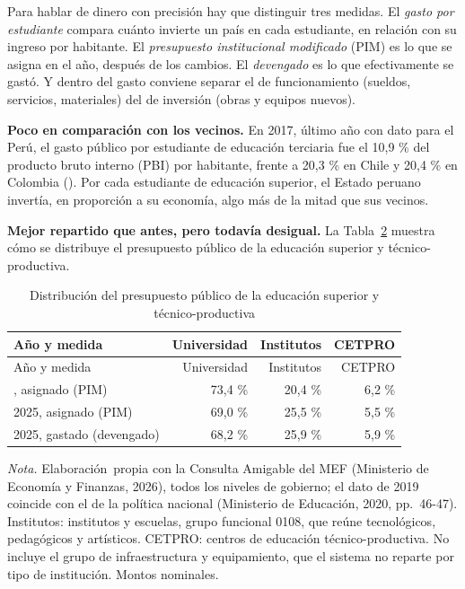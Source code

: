 \documentclass[
  jou,
  floatsintext,
  longtable,
  a4paper,
  nolmodern,
  notxfonts,
  notimes,
  12pt,
  colorlinks=true,linkcolor=blue,citecolor=blue,urlcolor=blue]{apa7}
\newenvironment{twocolumntable}%
{%
\begin{table}[!htbp]%
\onecolumn%
}%
{%
\twocolumn%
\end{table}%
}%
\begin{document}
Para hablar de dinero con precisión hay que distinguir tres medidas. El
\emph{gasto por estudiante} compara cuánto invierte un país en cada
estudiante, en relación con su ingreso por habitante. El
\emph{presupuesto institucional modificado} (PIM) es lo que se asigna en
el año, después de los cambios. El \emph{devengado} es lo que
efectivamente se gastó. Y dentro del gasto conviene separar el de
funcionamiento (sueldos, servicios, materiales) del de inversión (obras
y equipos nuevos).

\textbf{Poco en comparación con los vecinos.} En 2017, último año con
dato para el Perú, el gasto público por estudiante de educación
terciaria fue el 10,9 \% del producto bruto interno (PBI) por habitante,
frente a 20,3 \% en Chile y 20,4 \% en Colombia
(). Por cada estudiante de educación superior, el Estado peruano
invertía, en proporción a su economía, algo más de la mitad que sus
vecinos.

\textbf{Mejor repartido que antes, pero todavía desigual.} La
Tabla~\ref{tbl-gasto} muestra cómo se distribuye el presupuesto público
de la educación superior y técnico-productiva.

\begin{twocolumntable}

\begin{longtable}[]{@{}lrrr@{}}
\caption{Distribución del presupuesto público de la educación superior y
técnico-productiva}\label{tbl-gasto}\tabularnewline
\toprule\noalign{}
Año y medida & Universidad & Institutos & CETPRO \\
\midrule\noalign{}
\endfirsthead
\toprule\noalign{}
Año y medida & Universidad & Institutos & CETPRO \\
\midrule\noalign{}
\endhead
\bottomrule\noalign{}
\endlastfoot
2019, asignado (PIM) & 73,4 \% & 20,4 \% & 6,2 \% \\
2025, asignado (PIM) & 69,0 \% & 25,5 \% & 5,5 \% \\
2025, gastado (devengado) & 68,2 \% & 25,9 \% & 5,9 \% \\
\end{longtable}

\noindent \emph{Nota.} Elaboración~propia con la Consulta Amigable del
MEF (Ministerio de Economía y Finanzas, 2026), todos los niveles de
gobierno; el dato de 2019 coincide con el de la política nacional
(Ministerio de Educación, 2020, pp.~46-47). Institutos: institutos y
escuelas, grupo funcional 0108, que reúne tecnológicos, pedagógicos y
artísticos. CETPRO: centros de educación técnico-productiva. No incluye
el grupo de infraestructura y equipamiento, que el sistema no reparte
por tipo de institución. Montos nominales.

\end{twocolumntable}
\end{document}
